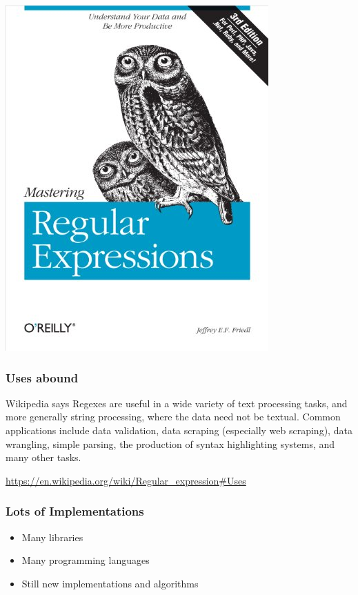 \documentclass[pdftex]{beamer}
\begin{document}
\begin{frame}
\begin{center}
    \includegraphics[scale=0.25]{book-mastering-regular-expressions}
  \end{center}
\end{frame}

\begin{frame}
  \frametitle{Uses abound}
  \begin{block}{Wikipedia says}
    Regexes are useful in a wide variety of text processing tasks, and
    more generally string processing, where the data need not be
    textual. Common applications include data validation, data
    scraping (especially web scraping), data wrangling, simple
    parsing, the production of syntax highlighting systems, and many
    other tasks.

    \url{https://en.wikipedia.org/wiki/Regular_expression\#Uses}
  \end{block}
\end{frame}

\begin{frame}
  \frametitle{Lots of Implementations}
  \begin{itemize}
  \item Many libraries
  \item Many programming languages
  \item Still new implementations and algorithms
  \end{itemize}
\end{frame}
\end{document}
